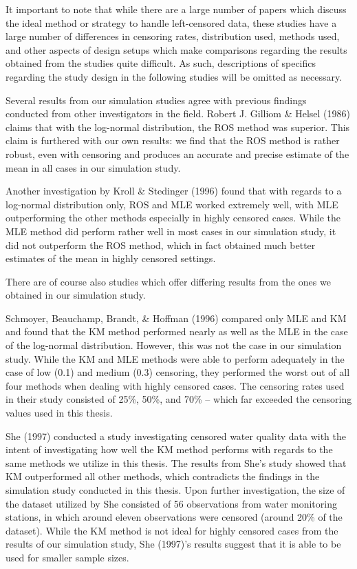 \documentclass[12pt, twoside]{amherstthesis}
\begin{document}
It important to note that while there are a large number of papers which discuss the ideal method or strategy to handle left-censored data, these studies have a large number of differences in censoring rates, distribution used, methods used, and other aspects of design setups which make comparisons regarding the results obtained from the studies quite difficult. As such, descriptions of specifics regarding the study design in the following studies will be omitted as necessary.

Several results from our simulation studies agree with previous findings conducted from other investigators in the field. Robert J. Gilliom \& Helsel (1986) claims that with the log-normal distribution, the ROS method was superior. This claim is furthered with our own results: we find that the ROS method is rather robust, even with censoring and produces an accurate and precise estimate of the mean in all cases in our simulation study.

Another investigation by Kroll \& Stedinger (1996) found that with regards to a log-normal distribution only, ROS and MLE worked extremely well, with MLE outperforming the other methods especially in highly censored cases. While the MLE method did perform rather well in most cases in our simulation study, it did not outperform the ROS method, which in fact obtained much better estimates of the mean in highly censored settings.

There are of course also studies which offer differing results from the ones we obtained in our simulation study.

Schmoyer, Beauchamp, Brandt, \& Hoffman (1996) compared only MLE and KM and found that the KM method performed nearly as well as the MLE in the case of the log-normal distribution. However, this was not the case in our simulation study. While the KM and MLE methods were able to perform adequately in the case of low (0.1) and medium (0.3) censoring, they performed the worst out of all four methods when dealing with highly censored cases. The censoring rates used in their study consisted of 25\%, 50\%, and 70\% -- which far exceeded the censoring values used in this thesis.

She (1997) conducted a study investigating censored water quality data with the intent of investigating how well the KM method performs with regards to the same methods we utilize in this thesis. The results from She's study showed that KM outperformed all other methods, which contradicts the findings in the simulation study conducted in this thesis. Upon further investigation, the size of the dataset utilized by She consisted of 56 observations from water monitoring stations, in which around eleven observations were censored (around 20\% of the dataset). While the KM method is not ideal for highly censored cases from the results of our simulation study, She (1997)'s results suggest that it is able to be used for smaller sample sizes.
\end{document}
